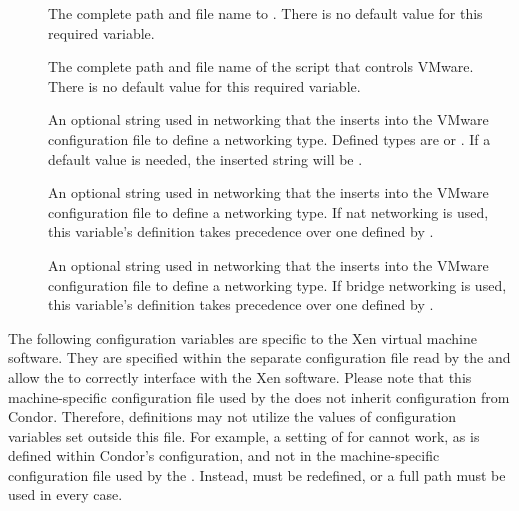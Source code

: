 \begin{description}
\item[]
  \label{param:VMwarePerl}
  The complete path and file name to .
  There is no default value for this required variable.

\item[]
  \label{param:VMwareScript}
  The complete path and file name of the script that controls VMware.
  There is no default value for this required variable.

\item[]
  \label{param:VMwareNetworkingType}
  An optional string used in networking that the 
  inserts into the VMware configuration file to define a networking type.
  Defined types are  or .
  If a default value is needed, the inserted string will be .

\item[]
  \label{param:VMwareNatNetworkingType}
  An optional string used in networking that the 
  inserts into the VMware configuration file to define a networking type.
  If nat networking is used, this variable's definition takes
  precedence over one defined by .

\item[]
  \label{param:VMwareBridgeNetworkingType}
  An optional string used in networking that the 
  inserts into the VMware configuration file to define a networking type.
  If bridge networking is used, this variable's definition takes
  precedence over one defined by .

\end{description}

The following configuration variables are specific to the Xen
virtual machine software.  They are specified within the separate configuration
file read by the  and allow the  to
correctly interface with the Xen software.
Please note that this machine-specific configuration file 
used by the  does not inherit configuration
from Condor.  Therefore, definitions may not utilize the values
of configuration variables set outside this file.
For example,
a setting of  for
 cannot work,
as  is defined within Condor's configuration,
and not in the machine-specific configuration file
used by the .
Instead,  must be redefined,
or a full path must be used in every case.

